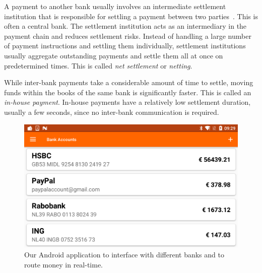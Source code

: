 A payment to another bank usually involves an intermediate settlement institution that is responsible for settling a payment between two parties~\cite{kokkola2011payment}.
This is often a central bank.
The settlement institution acts as an intermediary in the payment chain and reduces settlement risks.
Instead of handling a large number of payment instructions and settling them individually, settlement institutions usually aggregate outstanding payments and settle them all at once on predetermined times.
This is called \emph{net settlement} or \emph{netting}.

While inter-bank payments take a considerable amount of time to settle, moving funds within the books of the same bank is significantly faster.
This is called an \emph{in-house payment}.
In-house payments have a relatively low settlement duration, usually a few seconds, since no inter-bank communication is required.



\begin{figure}[!t]
	\centering
	\includegraphics[width=.8\linewidth]{iom/assets/android}
	\caption{Our Android application to interface with different banks and to route money in real-time.}
	\label{fig:android_app}
\end{figure}

